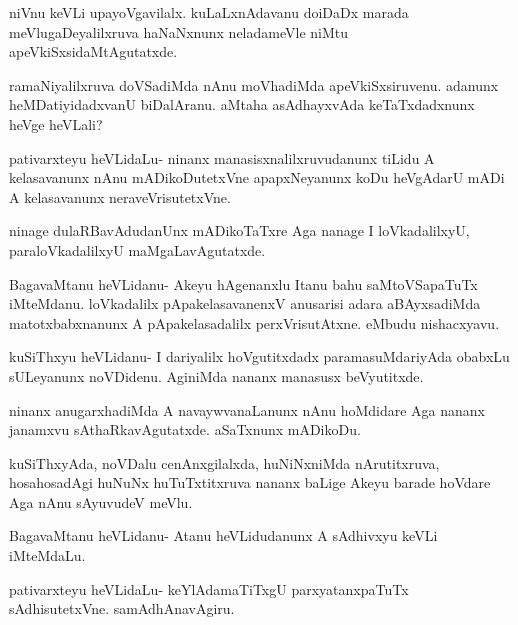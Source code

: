 \documentclass{article}
\begin{document}
\begin{mng}%
niVnu keVLi upayoVgavilalx. kuLaLxnAdavanu doiDaDx marada
meVlugaDeyalilxruva haNaNxnunx neladameVle niMtu apeVkiSxsidaMtAgutatxde.
\end{mng}

\begin{mng}%
ramaNiyalilxruva doVSadiMda nAnu moVhadiMda apeVkiSxsiruvenu.
adanunx heMDatiyidadxvanU biDalAranu. aMtaha asAdhayxvAda keTaTxdadxnunx 
heVge heVLali?
\end{mng}

\begin{mng}%
pativarxteyu heVLidaLu- ninanx manasisxnalilxruvudanunx tiLidu A
kelasavanunx nAnu mADikoDutetxVne apapxNeyanunx koDu heVgAdarU
mADi A kelasavanunx neraveVrisutetxVne.
\end{mng}

\begin{mng}%
ninage dulaRBavAdudanUnx mADikoTaTxre Aga nanage I loVkadalilxyU,
paraloVkadalilxyU maMgaLavAgutatxde.
\end{mng}

\begin{mng}%
BagavaMtanu heVLidanu- Akeyu hAgenanxlu Itanu bahu
saMtoVSapaTuTx iMteMdanu. loVkadalilx pApakelasavanenxV anusarisi adara
aBAyxsadiMda matotxbabxnanunx A pApakelasadalilx perxVrisutAtxne. eMbudu
nishacxyavu.
\end{mng}

\begin{mng}%
kuSiThxyu heVLidanu- I dariyalilx hoVgutitxdadx paramasuMdariyAda
obabxLu sULeyanunx noVDidenu. AginiMda nananx manasusx
beVyutitxde.
\end{mng}

\begin{mng}%
ninanx anugarxhadiMda A navaywvanaLanunx nAnu hoMdidare Aga
nananx janamxvu sAthaRkavAgutatxde. aSaTxnunx mADikoDu.
\end{mng}

\begin{mng}%
kuSiThxyAda, noVDalu cenAnxgilalxda, huNiNxniMda nArutitxruva,
hosahosadAgi huNuNx huTuTxtitxruva nananx baLige Akeyu barade hoVdare
Aga nAnu sAyuvudeV meVlu.
\end{mng}

\begin{mng}%
BagavaMtanu heVLidanu- Atanu heVLidudanunx A sAdhivxyu keVLi
iMteMdaLu.
\end{mng}

\begin{mng}%
pativarxteyu heVLidaLu- keYlAdamaTiTxgU parxyatanxpaTuTx sAdhisutetxVne.
samAdhAnavAgiru.
\end{mng}
\end{document}

